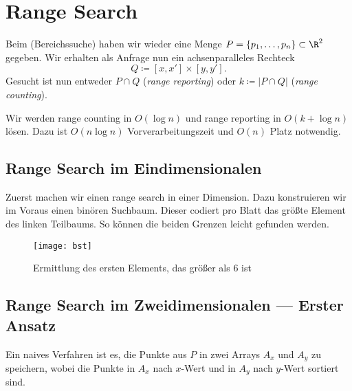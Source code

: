 \section{Range Search}

Beim  (Bereichssuche) haben wir wieder eine Menge \( P = \left \{ p_1, \dots, p_n \right \} \subset \R^2 \) gegeben. Wir erhalten als Anfrage nun ein achsenparalleles Rechteck
\begin{equation*}
  Q \coloneqq [x,x'] \times [y,y']\text{.}
\end{equation*}
Gesucht ist nun entweder \( P \cap Q \) (\emph{range reporting}) oder \( k \coloneqq \left\vert P \cap Q \right\vert \) (\emph{range counting}).

Wir werden range counting in \( O(\log n) \) und range reporting in \( O(k+\log n) \) lösen. Dazu ist \( O(n\log n) \) Vorverarbeitungszeit und \( O(n) \) Platz notwendig.

\subsection{Range Search im Eindimensionalen}

\begin{minipage}{.55\textwidth}
  Zuerst machen wir einen range search in einer Dimension. Dazu konstruieren wir im Voraus einen binören Suchbaum. Dieser codiert pro Blatt das größte Element des linken Teilbaums. So können die beiden Grenzen leicht gefunden werden.
  \vspace*{1em}
\end{minipage}
\hfill
\begin{minipage}{.4\textwidth}
  \begin{figure}[H]
    \texttt{[image: bst]}
    \caption{Ermittlung des ersten Elements, das größer als \( 6 \) ist}
  \end{figure}
  \vspace*{1em}
\end{minipage}

\subsection{Range Search im Zweidimensionalen --- Erster Ansatz}

Ein naives Verfahren ist es, die Punkte aus \( P \) in zwei Arrays \( A_x \) und \( A_y \) zu speichern, wobei die Punkte in \( A_x \) nach \( x \)-Wert und in \( A_y \) nach \( y \)-Wert sortiert sind.

